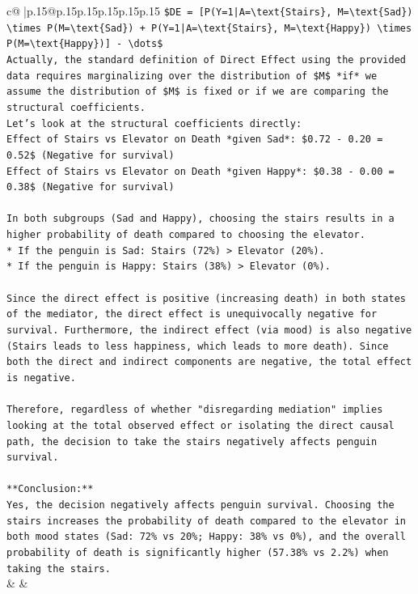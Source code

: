 \documentclass{article}
\begin{document}
{\begin{supertabular}{c@{$\;$}|p{.15\linewidth}@{}p{.15\linewidth}p{.15\linewidth}p{.15\linewidth}p{.15\linewidth}p{.15\linewidth}}
{{{\texttt{\$DE = {[}P(Y=1|A=\textbackslash{}text\{Stairs\}, M=\textbackslash{}text\{Sad\}) \textbackslash{}times P(M=\textbackslash{}text\{Sad\}) + P(Y=1|A=\textbackslash{}text\{Stairs\}, M=\textbackslash{}text\{Happy\}) \textbackslash{}times P(M=\textbackslash{}text\{Happy\}){]} {-} \textbackslash{}dots\$} \\
\texttt{Actually, the standard definition of Direct Effect using the provided data requires marginalizing over the distribution of \$M\$ *if* we assume the distribution of \$M\$ is fixed or if we are comparing the structural coefficients.} \\
\texttt{Let's look at the structural coefficients directly:} \\
\texttt{Effect of Stairs vs Elevator on Death *given Sad*: \$0.72 {-} 0.20 = 0.52\$ (Negative for survival)} \\
\texttt{Effect of Stairs vs Elevator on Death *given Happy*: \$0.38 {-} 0.00 = 0.38\$ (Negative for survival)} \\
\\ 
\texttt{In both subgroups (Sad and Happy), choosing the stairs results in a higher probability of death compared to choosing the elevator.} \\
\texttt{*   If the penguin is Sad: Stairs (72\%) > Elevator (20\%).} \\
\texttt{*   If the penguin is Happy: Stairs (38\%) > Elevator (0\%).} \\
\\ 
\texttt{Since the direct effect is positive (increasing death) in both states of the mediator, the direct effect is unequivocally negative for survival. Furthermore, the indirect effect (via mood) is also negative (Stairs leads to less happiness, which leads to more death). Since both the direct and indirect components are negative, the total effect is negative.} \\
\\ 
\texttt{Therefore, regardless of whether "disregarding mediation" implies looking at the total observed effect or isolating the direct causal path, the decision to take the stairs negatively affects penguin survival.} \\
\\ 
\texttt{**Conclusion:**} \\
\texttt{Yes, the decision negatively affects penguin survival. Choosing the stairs increases the probability of death compared to the elevator in both mood states (Sad: 72\% vs 20\%; Happy: 38\% vs 0\%), and the overall probability of death is significantly higher (57.38\% vs 2.2\%) when taking the stairs.} \\
            }
        }
    }
    & & \\ \\


\end{supertabular}}
\end{document}

